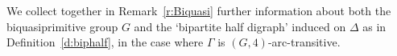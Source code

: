 \documentclass[11pt]{amsart}
\newtheorem{lemma}[theorem]{Lemma}
\newcommand{\Soc}{\mathrm{Soc}}
\newcommand{\Aut}{\mathrm{Aut}}
\newcommand{\Diag}{\mathrm{Diag}}
\begin{document}
    


 We collect together in Remark~\ref{r:Biquasi} further information about both the biquasiprimitive group $G$ and the `bipartite half digraph'  induced on $\Delta$ as in Definition~\ref{d:biphalf}, in the case where $\Gamma$ is $(G,4)$-arc-transitive. 


\end{document}
